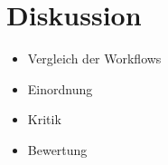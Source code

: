 
\section{Diskussion}
\label{sec:diskussion}

\begin{itemize}
    \item Vergleich der Workflows
    \item Einordnung
    \item Kritik
    \item Bewertung
\end{itemize}
